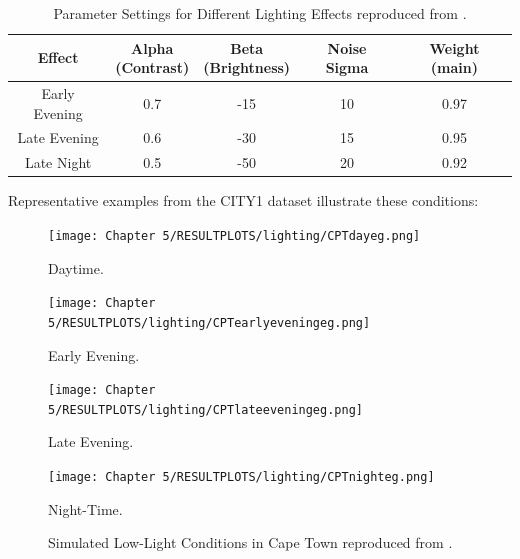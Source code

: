     \begin{table}[H]
        \centering
        \begin{tabular}{|c|c|c|c|c|}
        \hline
        \textbf{Effect} & \makecell{\textbf{Alpha} \\ \textbf{(Contrast)}} & \makecell{\textbf{Beta} \\ \textbf{(Brightness)}} & \textbf{Noise Sigma} & \textbf{Weight (main)} \\
        \hline
        Early Evening & 0.7 & -15 & 10 & {0.97} \\
        Late Evening & 0.6 & -30 & 15 & {0.95} \\
        Late Night & 0.5 & -50 & 20 & {0.92} \\
        \hline
        \end{tabular}
        \caption{Parameter Settings for Different Lighting Effects reproduced from \cite{GoogleEarth}.}
        \label{tab:lighting_params}
    \end{table}
    
        
Representative examples from the CITY1 dataset illustrate these conditions:
\begin{figure}[H]
    \centering
    \begin{minipage}{0.24\textwidth} %
        \centering
        \texttt{[image: Chapter 5/RESULTPLOTS/lighting/CPTdayeg.png]}
        \caption{Daytime.}
        \label{fig:Day_CPT}
    \end{minipage}\hfill
    \begin{minipage}{0.24\textwidth} %
        \centering
        \texttt{[image: Chapter 5/RESULTPLOTS/lighting/CPTearlyeveningeg.png]}
        \caption{Early Evening.}
        \label{fig:Early_Evening_CPT}
    \end{minipage}\hfill
    \begin{minipage}{0.24\textwidth} %
        \centering
        \texttt{[image: Chapter 5/RESULTPLOTS/lighting/CPTlateeveningeg.png]}
        \caption{Late Evening.}
        \label{fig:Late_Evening_CPT}
    \end{minipage}\hfill
    \begin{minipage}{0.24\textwidth} %
        \centering
        \texttt{[image: Chapter 5/RESULTPLOTS/lighting/CPTnighteg.png]}
        \caption{Night-Time.}
        \label{fig:Night_CPT}
    \end{minipage}
    
    \caption*{{Simulated Low-Light Conditions in Cape Town reproduced from \cite{GoogleEarth}.}}
    \label{fig:Lighting_CPT}
\end{figure}


